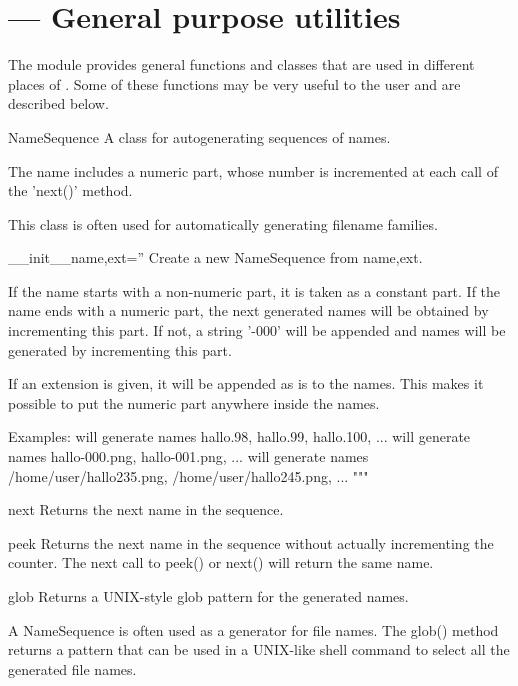 
\section{ --- General purpose utilities}
\label{sec:utils}



The  module provides general functions and classes that are used in different places of \pyformex. Some of these functions may be very useful to the user and are described below.


\begin{classdesc}{NameSequence}{}
A class for autogenerating sequences of names.

The name includes a numeric part, whose number is incremented
at each call of the 'next()' method.

This class is often used for automatically generating filename families.
    
\begin{memberdesc}{__init__}{name,ext=''}
Create a new NameSequence from name,ext.

If the name starts with a non-numeric part, it is taken as a constant part.
If the name ends with a numeric part, the next generated names will
be obtained by incrementing this part.
If not, a string '-000' will be appended and names will be generated
by incrementing this part.

If an extension is given, it will be appended as is to the names.
This makes it possible to put the numeric part anywhere inside the
names.

Examples:
 will generate names hallo.98, hallo.99, hallo.100, ...
 will generate names hallo-000.png, hallo-001.png, ...
 will generate names
/home/user/hallo235.png, /home/user/hallo245.png, ...
"""
\end{memberdesc}

\begin{memberdesc}{next}
Returns the next name in the sequence.
\end{memberdesc}

\begin{memberdesc}{peek}
Returns the next name in the sequence without actually incrementing the counter.
The next call to peek() or next() will return the same name.
\end{memberdesc}

\begin{memberdesc}{glob}
Returns a UNIX-style glob pattern for the generated names.

A NameSequence is often used as a generator for file names.
The glob() method returns a pattern that can be used in a
UNIX-like shell command to select all the generated file names.
\end{memberdesc}
\end{classdesc}


